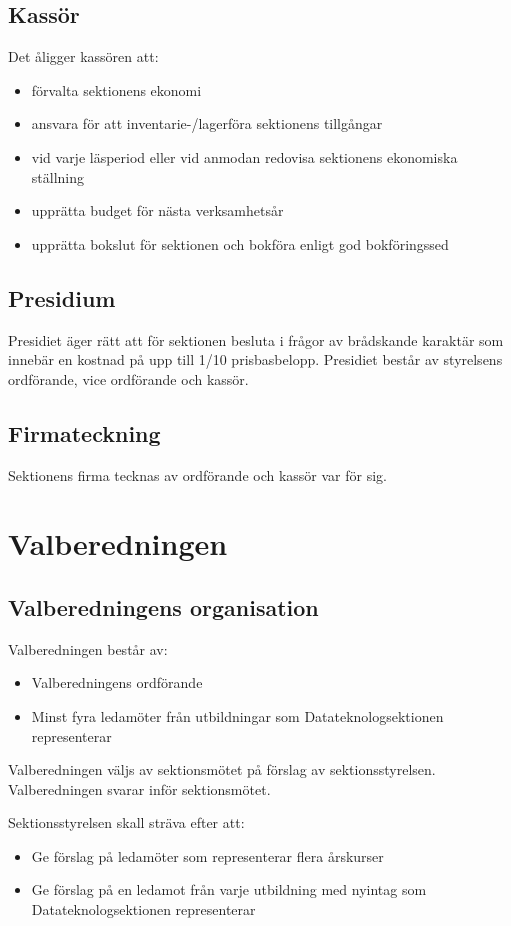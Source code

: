 \documentclass{datateknologsektionen-document}
\begin{document}
\subsection{Kassör}
Det åligger kassören att:
\begin{itemize}
  \item förvalta sektionens ekonomi
  \item ansvara för att inventarie-/lagerföra sektionens tillgångar
  \item vid varje läsperiod eller vid anmodan redovisa sektionens ekonomiska ställning
  \item upprätta budget för nästa verksamhetsår
  \item upprätta bokslut för sektionen och bokföra enligt god bokföringssed
\end{itemize}

\subsection{Presidium}
Presidiet äger rätt att för sektionen besluta i frågor av brådskande karaktär som
innebär en kostnad på upp till 1/10 prisbasbelopp. Presidiet består av styrelsens
ordförande, vice ordförande och kassör.

\subsection{Firmateckning}
Sektionens firma tecknas av ordförande och kassör var för sig.

\section{Valberedningen}
\subsection{Valberedningens organisation}
Valberedningen består av:
\begin{itemize}
  \item Valberedningens ordförande
  \item Minst fyra ledamöter från utbildningar som Datateknologsektionen representerar
\end{itemize}

Valberedningen väljs av sektionsmötet på förslag av sektionsstyrelsen. Valberedningen
svarar inför sektionsmötet.

Sektionsstyrelsen skall sträva efter att:
\begin{itemize}
  \item Ge förslag på ledamöter som representerar flera årskurser
  \item Ge förslag på en ledamot från varje utbildning med nyintag som Datateknologsektionen representerar
\end{itemize}
\end{document}
